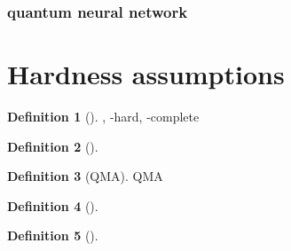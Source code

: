 \documentclass[
10pt,
aps,
pra,
linenumbers,
floatfix,
]{revtex4-2}
\theoremstyle{plain}
\theoremstyle{definition}
\newtheorem{definition}{Definition}
\begin{document}
\subsubsection{quantum neural network}\label{sec:quantum_neural_network}

\section{Hardness assumptions}
\begin{definition}[\NP]\label{def:np}
	\NP, \NP-hard, \NP-complete
\end{definition}
\begin{definition}[\sharpP]\label{def:sharpp}
	\sharpP
\end{definition}
\begin{definition}[QMA]\label{def:qma}
	QMA
\end{definition}
\begin{definition}[\BPP]\label{def:bpp}
	\BPP
\end{definition}
\begin{definition}[\BQP]\label{def:bqp}
	\BQP
\end{definition}

\end{document}
